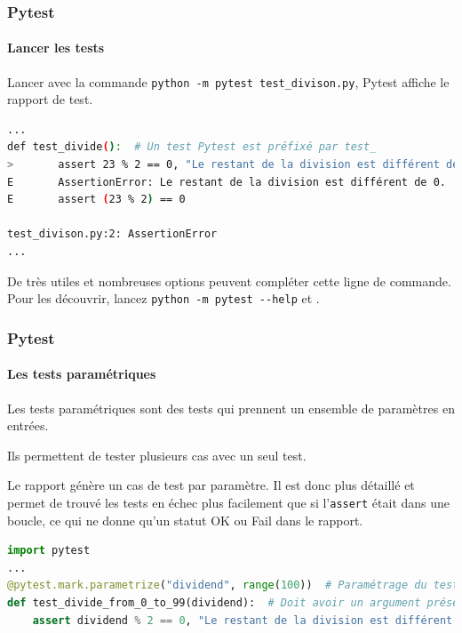 \documentclass{beamer}
\begin{document}
    \begin{frame}[fragile]
        \frametitle{Pytest}
        \framesubtitle{Lancer les tests}
        \transdissolve
        Lancer avec la commande \lstinline{python -m pytest test_divison.py}, Pytest affiche le rapport de test.
        \begin{lstlisting}[language=sh]
...
def test_divide():  # Un test Pytest est préfixé par test_
>       assert 23 % 2 == 0, "Le restant de la division est différent de 0."
E       AssertionError: Le restant de la division est différent de 0.
E       assert (23 % 2) == 0

test_divison.py:2: AssertionError
...
        \end{lstlisting}

        De très utiles et nombreuses options peuvent compléter cette ligne de commande.
        Pour les découvrir, lancez \lstinline{python -m pytest --help} et .
    \end{frame}

    \begin{frame}[fragile]
        \frametitle{Pytest}
        \framesubtitle{Les tests paramétriques}
        \transdissolve
        Les tests paramétriques sont des tests qui prennent un ensemble de paramètres en entrées.

        Ils permettent de tester plusieurs cas avec un seul test.

        Le rapport génère un cas de test par paramètre. Il est donc plus détaillé et permet de trouvé
        les tests en échec plus facilement que si l'\lstinline {assert} était dans une boucle, ce qui ne donne qu'un statut OK ou Fail dans le rapport.
        \begin{lstlisting}[language=Python]
import pytest
...
@pytest.mark.parametrize("dividend", range(100))  # Paramétrage du test
def test_divide_from_0_to_99(dividend):  # Doit avoir un argument présent dans le paramétrage
    assert dividend % 2 == 0, "Le restant de la division est différent de 0."
        \end{lstlisting}
    \end{frame}
\end{document}
